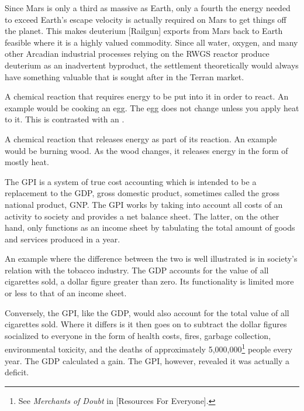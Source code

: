 Since Mars is only a third as massive as Earth, only a fourth the energy needed to exceed Earth's escape velocity is actually required on Mars to get things off the planet. This makes deuterium [Railgun] exports from Mars back to Earth feasible where it is a highly valued commodity. Since all water, oxygen, and many other Arcadian industrial processes relying on the RWGS reactor produce deuterium as an inadvertent byproduct, the settlement theoretically would always have something valuable that is sought after in the Terran market.

A chemical reaction that requires energy to be put into it in order to react. An example would be cooking an egg. The egg does not change unless you apply heat to it. This is contrasted with an .

A chemical reaction that releases energy as part of its reaction. An example would be burning wood. As the wood changes, it releases energy in the form of mostly heat.

The GPI is a system of true cost accounting which is intended to be a replacement to the GDP, gross domestic product, sometimes called the gross national product, GNP. The GPI works by taking into account all costs of an activity to society and provides a net balance sheet. The latter, on the other hand, only functions as an income sheet by tabulating the total amount of goods and services produced in a year. 

An example where the difference between the two is well illustrated is in society's relation with the tobacco industry. The GDP accounts for the value of all cigarettes sold, a dollar figure greater than zero. Its functionality is limited more or less to that of an income sheet.

Conversely, the GPI, like the GDP, would also account for the total value of all cigarettes sold. Where it differs is it then goes on to subtract the dollar figures socialized to everyone in the form of health costs, fires, garbage collection, environmental toxicity, and the deaths of approximately 5,000,000\footnote{See {\it Merchants of Doubt} in [Resources For Everyone].} people every year. The GDP calculated a gain. The GPI, however, revealed it was actually a deficit.

